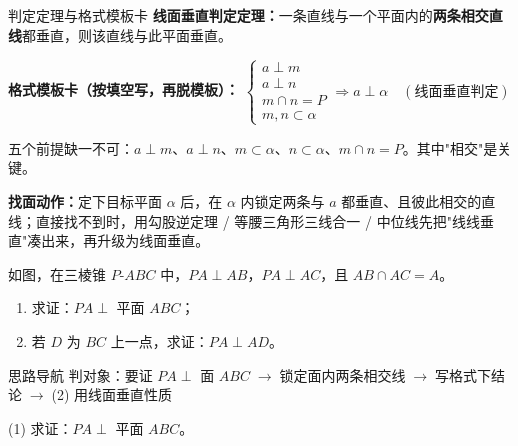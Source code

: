 \documentclass{exam-zh}
\begin{document}
\clearpage
{}


\begin{eduSolutionBox}{判定定理与格式模板卡}
  \begingroup
  \setlength{\parskip}{2.5mm}
\textbf{线面垂直判定定理：}一条直线与一个平面内的\textbf{两条相交直线}都垂直，则该直线与此平面垂直。\par
\textbf{格式模板卡（按填空写，再脱模板）：} $\begin{cases} a\perp m \\ a\perp n \\ m\cap n=P \\ m,n\subset\alpha \end{cases} \Rightarrow a\perp\alpha\quad(\text{线面垂直判定})$\par
五个前提缺一不可：$a\perp m$、$a\perp n$、$m\subset\alpha$、$n\subset\alpha$、$m\cap n=P$。其中"相交"是关键。\par
\textbf{找面动作：}定下目标平面 $\alpha$ 后，在 $\alpha$ 内锁定两条与 $a$ 都垂直、且彼此相交的直线；直接找不到时，用勾股逆定理 / 等腰三角形三线合一 / 中位线先把"线线垂直"凑出来，再升级为线面垂直。\par
  \endgroup
\end{eduSolutionBox}




\begin{eduProblemBlock}[例题 1]
如图，在三棱锥 $P\text{-}ABC$ 中，$PA\perp AB$，$PA\perp AC$，且 $AB\cap AC=A$。
\begin{enumerate}[label=(\arabic*)]
  \item 求证：$PA\perp$ 平面 $ABC$；
  \item 若 $D$ 为 $BC$ 上一点，求证：$PA\perp AD$。
\end{enumerate}

\end{eduProblemBlock}





\begin{eduAuxItem}{思路导航}
判对象：要证 $PA\perp$ 面 $ABC$$\;\to\;$锁定面内两条相交线$\;\to\;$写格式下结论$\;\to\;$(2) 用线面垂直性质\end{eduAuxItem}




\begin{eduSubQuestionItem}{(1)}
求证：$PA\perp$ 平面 $ABC$。\end{eduSubQuestionItem}
\end{document}
